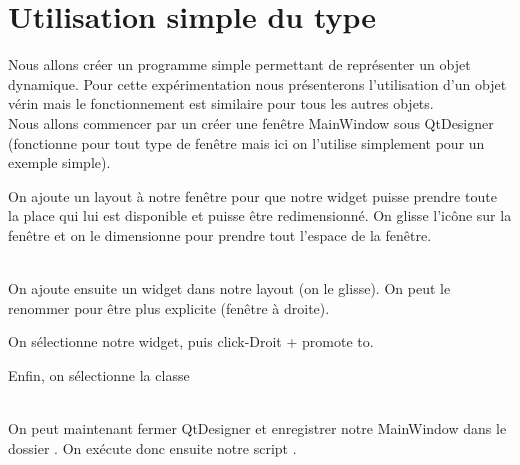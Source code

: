  
 
 
 
 
 
 
 
 
\section{Utilisation simple du type}

Nous allons créer un programme simple permettant de représenter un objet dynamique. Pour cette expérimentation nous présenterons l'utilisation d'un objet vérin mais le fonctionnement est similaire pour tous les autres objets.\\

Nous allons commencer par un créer une fenêtre MainWindow sous QtDesigner (fonctionne pour tout type de fenêtre mais ici on l'utilise simplement pour un exemple simple).


On ajoute un layout à notre fenêtre pour que notre widget puisse prendre toute la place qui lui est disponible et puisse être redimensionné. On glisse l'icône sur la fenêtre et on le dimensionne pour prendre tout l'espace de la fenêtre.

\\

On ajoute ensuite un widget dans notre layout (on le glisse). On peut le renommer pour être plus explicite (fenêtre à droite).


On sélectionne notre widget, puis click-Droit + promote to. 


Enfin, on sélectionne la classe 

\textcolor{red}{} \\

On peut maintenant fermer QtDesigner et enregistrer notre MainWindow dans le dossier . On exécute donc ensuite notre script .\\

